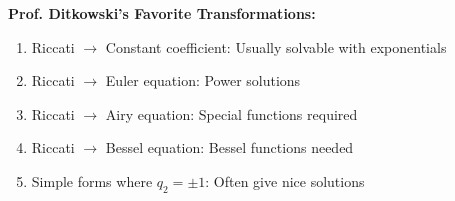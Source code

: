 \documentclass[12pt]{article}
\begin{document}
\begin{examtip}
\textbf{Prof. Ditkowski's Favorite Transformations:}
\begin{enumerate}
    \item Riccati $\to$ Constant coefficient: Usually solvable with exponentials
    \item Riccati $\to$ Euler equation: Power solutions
    \item Riccati $\to$ Airy equation: Special functions required
    \item Riccati $\to$ Bessel equation: Bessel functions needed
    \item Simple forms where $q_2 = \pm 1$: Often give nice solutions
\end{enumerate}
\end{examtip}
\end{document}
